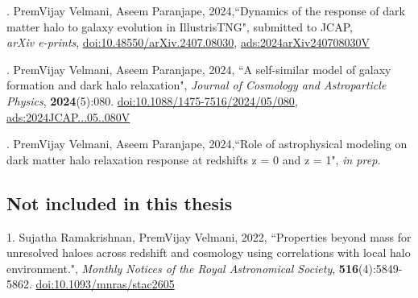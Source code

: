 \documentclass[a4paper, 12pt, oneside]{Thesis}  %
\newcommand{\doi}[1]{\href{https://doi.org/#1}{doi:#1}}
\begin{document}
. PremVijay Velmani, Aseem Paranjape, 2024,``Dynamics of the response of dark matter halo to galaxy evolution in IllustrisTNG", submitted to JCAP, \\ \textit{arXiv e-prints},
\doi{10.48550/arXiv.2407.08030}, 
\href{https://ui.adsabs.harvard.edu/abs/2024arXiv240708030V}{ads:2024arXiv240708030V}

\vspace{0.5cm}

. PremVijay Velmani, Aseem Paranjape, 2024, ``A self-similar model of galaxy formation and dark halo relaxation", \textit{Journal of Cosmology and Astroparticle Physics}, 
\textbf{2024}(5):080. 
\doi{10.1088/1475-7516/2024/05/080},
\href{https://ui.adsabs.harvard.edu/abs/2024JCAP...05..080V}{ads:2024JCAP...05..080V}

\vspace{0.5cm}

. PremVijay Velmani, Aseem Paranjape, 2024,``Role of astrophysical modeling on dark matter halo relaxation response at redshifts z = 0 and z = 1", \textit{in prep.}

\subsection*{Not included in this thesis}

1. Sujatha Ramakrishnan, PremVijay Velmani, 2022, ``Properties beyond mass
for unresolved haloes across redshift and cosmology using correlations with local halo environment.", \textit{Monthly Notices of the Royal Astronomical Society}, 
\textbf{516}(4):5849-5862. 
\doi{10.1093/mnras/stac2605}

\clearpage


\tableofcontents  %

\listoffigures  %

\listoftables  %










\mainmatter	  %
\pagestyle{fancy}  %

\fancyhead[L]{\emph{\leftmark}}
\renewcommand{\chaptermark}[1]{\markboth{#1}{}}




\end{document}
